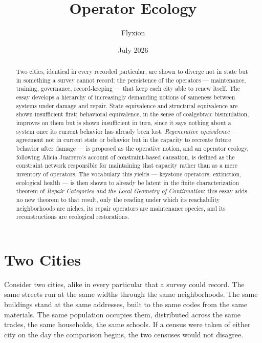 \documentclass[11pt]{article}
\title{Operator Ecology}
\author{Flyxion}
\date{July 2026}
\begin{document}
\maketitle

\begin{abstract}
Two cities, identical in every recorded particular, are shown to
diverge not in state but in something a survey cannot record: the
persistence of the operators --- maintenance, training, governance,
record-keeping --- that keep each city able to renew itself. The
essay develops a hierarchy of increasingly demanding notions of
sameness between systems under damage and repair. State equivalence
and structural equivalence are shown insufficient first; behavioral
equivalence, in the sense of coalgebraic bisimulation, improves on
them but is shown insufficient in turn, since it says nothing about
a system once its current behavior has already been lost.
\emph{Regenerative equivalence} --- agreement not in current state or
behavior but in the capacity to recreate future behavior after damage
--- is proposed as the operative notion, and an operator ecology,
following Alicia Juarrero's account of constraint-based causation, is
defined as the constraint network responsible for maintaining that
capacity rather than as a mere inventory of operators. The vocabulary
this yields --- keystone operators, extinction, ecological health ---
is then shown to already be latent in the finite characterization
theorem of \emph{Repair Categories and the Local Geometry of
Continuation}: this essay adds no new theorem to that result, only
the reading under which its reachability neighborhoods are niches,
its repair operators are maintenance species, and its reconstructions
are ecological restorations.
\end{abstract}


\section{Two Cities}\label{sec:cities}

Consider two cities, alike in every particular that a survey could
record. The same streets run at the same widths through the same
neighborhoods. The same buildings stand at the same addresses, built
to the same codes from the same materials. The same population
occupies them, distributed across the same trades, the same
households, the same schools. If a census were taken of either city
on the day the comparison begins, the two censuses would not
disagree.
\end{document}
